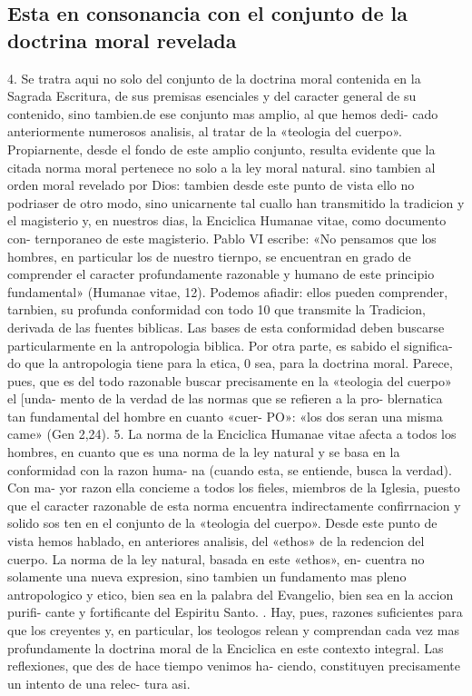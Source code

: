 \documentclass[letterpaper]{report}
\begin{document}
		\subsection{Esta en consonancia con el conjunto de la doctrina moral revelada}
			4. Se tratra aqui no solo del conjunto de la doctrina 
			moral contenida en la Sagrada Escritura, de sus premisas 
			esenciales y del caracter general de su contenido, sino 
			tambien.de ese conjunto mas amplio, al que hemos dedi- 
			cado anteriormente numerosos analisis, al tratar de la 
			«teologia del cuerpo». 
			Propiarnente, desde el fondo de este amplio conjunto, 
			resulta evidente que la citada norma moral pertenece no 
			solo a la ley moral natural. sino tambien al orden moral 
			revelado por Dios: tambien desde este punto de vista ello 
			no podriaser de otro modo, sino unicarnente tal cuallo 
			han transmitido la tradicion y el magisterio y, en nuestros 
			dias, la Enciclica Humanae vitae, como documento con- 
			ternporaneo de este magisterio. 
			Pablo VI escribe: «No pensamos que los hombres, en 
			particular los de nuestro tiernpo, se encuentran en grado 
			de comprender el caracter profundamente razonable y 
			humano de este principio fundamental» (Humanae vitae, 
			12). Podemos afiadir: ellos pueden comprender, tarnbien, 
			su profunda conformidad con todo 10 que transmite la 
			Tradicion, derivada de las fuentes biblicas. Las bases de 
			esta conformidad deben buscarse particularmente en la 
			antropologia biblica. Por otra parte, es sabido el significa- 
			do que la antropologia tiene para la etica, 0 sea, para la 
			doctrina moral. Parece, pues, que es del todo razonable 
			buscar precisamente en la «teologia del cuerpo» el [unda- 
			mento de la verdad de las normas que se refieren a la pro- 
			blernatica tan fundamental del hombre en cuanto «cuer- 
			PO»: «los dos seran una misma came» (Gen 2,24). 
			5. La norma de la Enciclica Humanae vitae afecta a 
			todos los hombres, en cuanto que es una norma de la ley 
			natural y se basa en la conformidad con la razon huma- 
			na (cuando esta, se entiende, busca la verdad). Con ma- 
			yor razon ella concieme a todos los fieles, miembros de 
			la Iglesia, puesto que el caracter razonable de esta norma 
			encuentra indirectamente confirrnacion y solido sos ten en 
			el conjunto de la «teologia del cuerpo». Desde este punto 
			de vista hemos hablado, en anteriores analisis, del «ethos» 
			de la redencion del cuerpo. 
			La norma de la ley natural, basada en este «ethos», en- 
			cuentra no solamente una nueva expresion, sino tambien 
			un fundamento mas pleno antropologico y etico, bien sea 
			en la palabra del Evangelio, bien sea en la accion purifi- 
			cante y fortificante del Espiritu Santo. 	. 
			Hay, pues, razones suficientes para que los creyentes 
			y, en particular, los teologos relean y comprendan cada 
			vez mas profundamente la doctrina moral de la Enciclica 
			en este contexto integral. 
			Las reflexiones, que des de hace tiempo venimos ha- 
			ciendo, constituyen precisamente un intento de una relec- 
			tura asi. 
	
\end{document}
